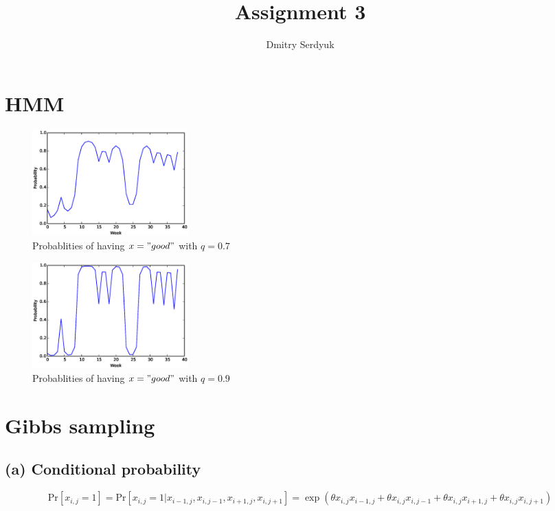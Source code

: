 \documentclass[a4paper]{article}
\author{Dmitry Serdyuk}
\title{Assignment 3}
\date{}
\begin{document}
\section{}
\section{HMM}

\begin{figure}
    \begin{center}
        \includegraphics[width=6cm]{prob_07.eps}
        \caption{Probablities of having $x = "good"$ with $q=0.7$}
        \label{fig:hmm07}
    \end{center}
\end{figure}

\begin{figure}
    \begin{center}
        \includegraphics[width=6cm]{prob_09.eps}
        \caption{Probablities of having $x = "good"$ with $q=0.9$}
        \label{fig:hmm09}
    \end{center}
\end{figure}

\section{}
\section{Gibbs sampling}
\subsection{(a) Conditional probability}
\begin{equation}
\mathrm{Pr}\left[x_{i, j} = 1\right] = 
\mathrm{Pr}\left[x_{i, j} = 1| x_{i - 1, j}, x_{i, j - 1}, x_{i + 1, j}, x_{i, j + 1}\right] =
\exp(\theta x_{i, j} x_{i - 1, j} + \theta x_{i, j} x_{i, j - 1} + \theta x_{i, j} x_{i + 1, j} + \theta x_{i, j} x_{i, j + 1})
\end{equation}
\end{document}
